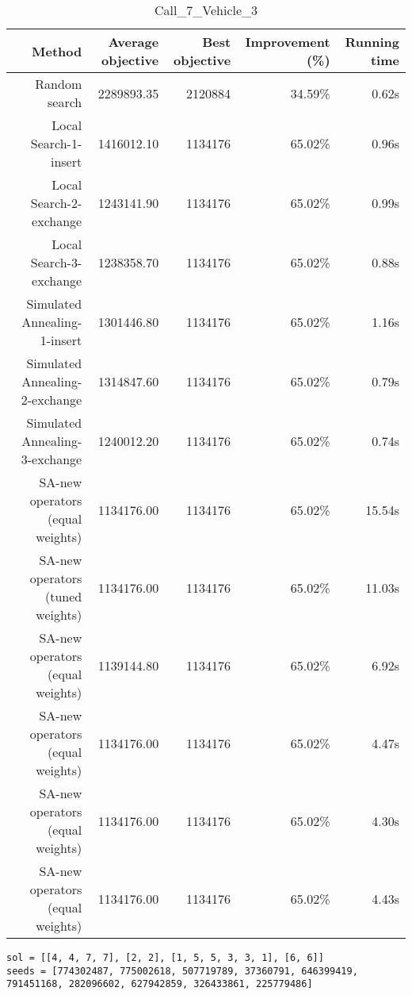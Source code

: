\begin{table}[ht]
\centering
\caption{Call\_7\_Vehicle\_3}
\label{tab:call7vehicle3}
\begin{tabular}{|r|r|r|r|r|}
Method & Average objective & Best objective & Improvement (\%) & Running time \\
\hline
Random search & 2289893.35 & 2120884 & 34.59\% & 0.62s\\
Local Search-1-insert & 1416012.10 & 1134176 & 65.02\% & 0.96s\\
Local Search-2-exchange & 1243141.90 & 1134176 & 65.02\% & 0.99s\\
Local Search-3-exchange & 1238358.70 & 1134176 & 65.02\% & 0.88s\\
Simulated Annealing-1-insert & 1301446.80 & 1134176 & 65.02\% & 1.16s\\
Simulated Annealing-2-exchange & 1314847.60 & 1134176 & 65.02\% & 0.79s\\
Simulated Annealing-3-exchange & 1240012.20 & 1134176 & 65.02\% & 0.74s\\
SA-new operators (equal weights) & 1134176.00 & 1134176 & 65.02\% & 15.54s\\
SA-new operators (tuned weights) & 1134176.00 & 1134176 & 65.02\% & 11.03s\\
SA-new operators (equal weights) & 1139144.80 & 1134176 & 65.02\% & 6.92s\\
SA-new operators (equal weights) & 1134176.00 & 1134176 & 65.02\% & 4.47s\\
SA-new operators (equal weights) & 1134176.00 & 1134176 & 65.02\% & 4.30s\\
SA-new operators (equal weights) & 1134176.00 & 1134176 & 65.02\% & 4.43s\\
\end{tabular}%
\end{table}
\begin{lstlisting}[label={lst:call7vehicle3},caption=Optimal solution call\_7\_vehicle\_3]
sol = [[4, 4, 7, 7], [2, 2], [1, 5, 5, 3, 3, 1], [6, 6]]
seeds = [774302487, 775002618, 507719789, 37360791, 646399419, 791451168, 282096602, 627942859, 326433861, 225779486]
\end{lstlisting}%
\clearpage


